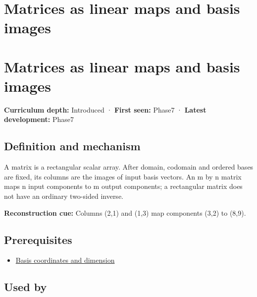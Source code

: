 \hypertarget{appendix-bd39c3bf5d64}{}
\section*{Matrices as linear maps and basis images}
\section{Matrices as linear maps and basis images}\label{matrices-as-linear-maps-and-basis-images}

\textbf{Curriculum depth:} Introduced · \textbf{First seen:} Phase7 · \textbf{Latest development:} Phase7

\subsection{Definition and mechanism}\label{definition-and-mechanism}

A matrix is a rectangular scalar array. After domain, codomain and ordered bases are fixed, its columns are the images of input basis vectors. An m by n matrix maps n input components to m output components; a rectangular matrix does not have an ordinary two-sided inverse.

\textbf{Reconstruction cue:} Columns (2,1) and (1,3) map components (3,2) to (8,9).

\subsection{Prerequisites}\label{prerequisites}

\begin{itemize}
\tightlist
\item
  \hyperref[appendix-ce0341f7ea0d]{Basis coordinates and dimension}
\end{itemize}

\subsection{Used by}\label{used-by}

